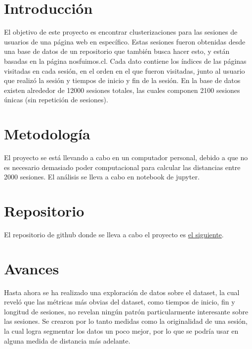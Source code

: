 \documentclass[letterpaper,11pt]{article} %
\begin{document}







\section{Introducción}
	El objetivo de este proyecto es encontrar clusterizaciones para las sesiones de usuarios de una página web en específico. Estas sesiones fueron obtenidas desde una base de datos de un repositorio que también busca hacer esto, y están basadas en la página nosfuimos.cl. Cada dato contiene los índices de las páginas visitadas en cada sesión, en el orden en el que fueron visitadas, junto al usuario que realizó la sesión y tiempos de inicio y fin de la sesión. En la base de datos existen alrededor de 12000 sesiones totales, las cuales componen 2100 sesiones únicas (sin repetición de sesiones).

\section{Metodología}
	El proyecto se está llevando a cabo en un computador personal, debido a que no es necesario demasiado poder computacional para calcular las distancias entre 2000 sesiones. El análisis se lleva a cabo en notebook de jupyter.

\section{Repositorio}
	El repositorio de github donde se lleva a cabo el proyecto es \href{https://github.com/danno-s/proyecto-bayes}{el siguiente}.

\section{Avances}
	Hasta ahora se ha realizado una exploración de datos sobre el dataset, la cual reveló que las métricas más obvias del dataset, como tiempos de inicio, fin y longitud de sesiones, no revelan ningún patrón particularmente interesante sobre las sesiones. Se crearon por lo tanto medidas como la originalidad de una sesión, la cual logra segmentar los datos un poco mejor, por lo que se podría usar en alguna medida de distancia más adelante.
\end{document}

